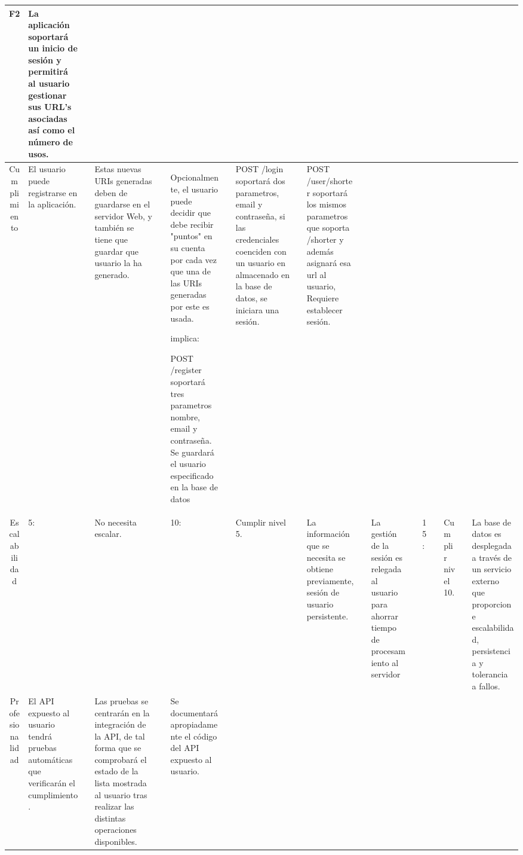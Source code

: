 \documentclass{article}
\begin{document}
\begin{table}[hbtp]
    \footnotesize
    \centering
    \settowidth{}
    \setlength\extrarowheight{5pt}
    \begin{tabulary}{\textwidth}{ C L }
        \textbf{F2} & La aplicación soportará un inicio de sesión y permitirá al usuario gestionar sus URL's asociadas así como el número de usos.
        \\
    \hline
    
    Cumplimiento &
         \quad El usuario puede registrarse en la aplicación. &&
         \quad Estas nuevas URIs generadas deben de guardarse en el servidor Web, y también se tiene que guardar que usuario la ha generado. &&
         \quad Opcionalmente, el usuario puede decidir que debe recibir "puntos" en su cuenta por cada vez que una de las URIs generadas por este es usada.
        
        implica:

         \quad POST /register soportará tres parametros nombre, email y contraseña. Se guardará el usuario especificado en la base de datos &&

         \quad POST /login soportará dos parametros, email y contraseña, si las credenciales coenciden con un usuario en almacenado en la base de datos, se iniciara una sesión. &&

         \quad POST /user/shorter soportará los mismos parametros que soporta /shorter y además asignará esa url al usuario, Requiere establecer sesión. 
        \\
        
    Escalabilidad &
    5: &&
        \quad {} \quad No necesita escalar. &&
         
    10: &&
        \quad {} \quad Cumplir nivel 5. && 

        \quad {} \quad La información que se necesita se obtiene previamente, sesión de usuario persistente. &&
		
        \quad {} \quad La gestión de la sesión es relegada al usuario para ahorrar tiempo de procesamiento al servidor &&
    15: &&
        \quad {} \quad Cumplir nivel 10. && 
        \quad {} \quad La base de datos es desplegada a través de un servicio externo que proporcione escalabilidad, persistencia y tolerancia a fallos.
         \\
 
    Profesionalidad & 
     \quad El API expuesto al usuario tendrá pruebas automáticas que verificarán el cumplimiento. &&
     \quad Las pruebas se centrarán en la integración de la API, de tal forma que se comprobará el estado de la lista mostrada al usuario tras realizar las distintas operaciones disponibles. &&
     \quad Se documentará apropiadamente el código del API expuesto al usuario.
    \end{tabulary}
\end{table}
 
\end{document}

